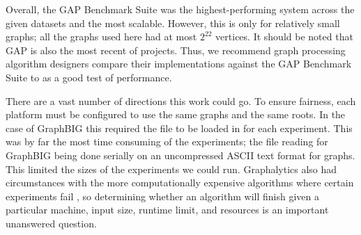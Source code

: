 \documentclass{llncs}
\begin{document}
Overall, the GAP Benchmark Suite was the highest-performing system across the given datasets and the most scalable. However, this is only for relatively small graphs; all the graphs used here had at most $2^{22}$ vertices. It should be noted that GAP is also the most recent of projects. Thus, we recommend graph processing algorithm designers compare their implementations against the GAP Benchmark Suite to as a good test of performance.

There are a vast number of directions this work could go. To ensure fairness, each platform must be configured to use the same graphs and the same roots. In the case of GraphBIG this required the file to be loaded in for each experiment. This was by far the most time consuming of the experiments; the file reading for GraphBIG being done serially on an uncompressed ASCII text format for graphs. This limited the sizes of the experiments we could run. Graphalytics also had circumstances with the more computationally expensive algorithms  where certain experiments fail \cite{Iosup:2016:Graphalyticstech}, so determining whether an algorithm will finish given a particular machine, input size, runtime limit, and resources is an important unanswered question.



\end{document}
